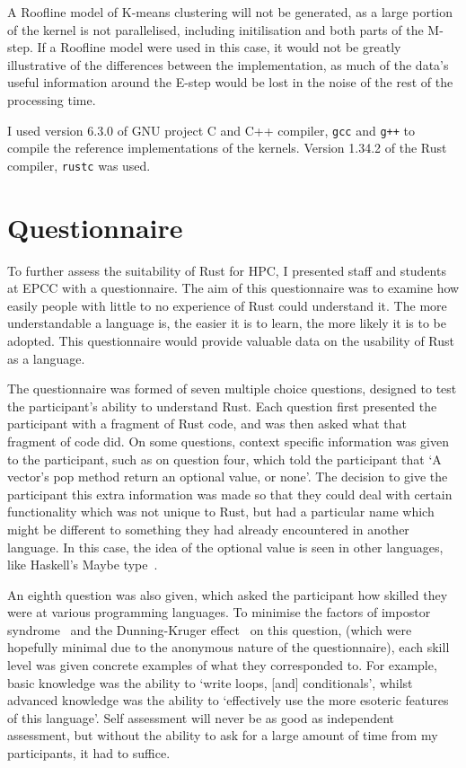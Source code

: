 A Roofline model of K-means clustering will not be generated, as a large portion of the kernel is not parallelised, including initilisation and both parts of the M-step. If a Roofline model were used in this case, it would not be greatly illustrative of the differences between the implementation, as much of the data's useful information around the E-step would be lost in the noise of the rest of the processing time.

I used version 6.3.0 of GNU project C and C++ compiler, \texttt{gcc} and \texttt{g++} to compile the reference implementations of the kernels. Version 1.34.2 of the Rust compiler, \texttt{rustc} was used.
\section{Questionnaire}\label{sec:meth-q}
To further assess the suitability of Rust for HPC, I presented staff and students at EPCC with a questionnaire. The aim of this questionnaire was to examine how easily people with little to no experience of Rust could understand it. The more understandable a language is, the easier it is to learn, the more likely it is to be adopted. This questionnaire would provide valuable data on the usability of Rust as a language.

The questionnaire was formed of seven multiple choice questions, designed to test the participant's ability to understand Rust. Each question first presented the participant with a fragment of Rust code, and was then asked what that fragment of code did. On some questions, context specific information was given to the participant, such as on question four, which told the participant that `A vector's pop method return an optional value, or none'. The decision to give the participant this extra information was made so that they could deal with certain functionality which was not unique to Rust, but had a particular name which might be different to something they had already encountered in another language. In this case, the idea of the optional value is seen in other languages, like Haskell's Maybe type~\cite{HaskellMaybe}.

An eighth question was also given, which asked the participant how skilled they were at various programming languages.
To minimise the factors of impostor syndrome~\cite{langford1993} and the Dunning-Kruger effect~\cite{kruger1999} on this question, (which were hopefully minimal due to the anonymous nature of the questionnaire), each skill level was given concrete examples of what they corresponded to. For example, basic knowledge was the ability to `write loops, [and] conditionals', whilst advanced knowledge was the ability to `effectively use the more esoteric features of this language'. Self assessment will never be as good as independent assessment, but without the ability to ask for a large amount of time from my participants, it had to suffice.


